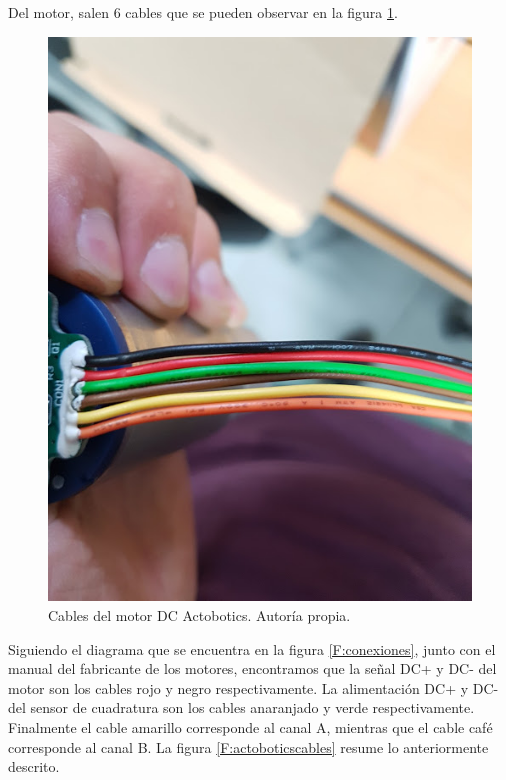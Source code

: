 Del motor, salen 6 cables que se pueden observar en la figura \ref{F:cablesmotor}.

\begin{figure}[h!]
\centering
\includegraphics[scale=0.5]{imagenes/cables.jpg}
\caption{Cables del motor DC Actobotics. Autoría propia.}
\label{F:cablesmotor}
\end{figure}

Siguiendo el diagrama que se encuentra en la figura \ref{F:conexiones}, junto con el manual del fabricante de los motores, encontramos que la señal DC+ y DC- del motor son los cables rojo y negro respectivamente. La alimentación DC+ y DC- del sensor de cuadratura son los cables anaranjado y verde respectivamente. Finalmente el cable amarillo corresponde al canal A, mientras que el cable café corresponde al canal B. La figura \ref{F:actoboticscables} resume lo anteriormente descrito.

